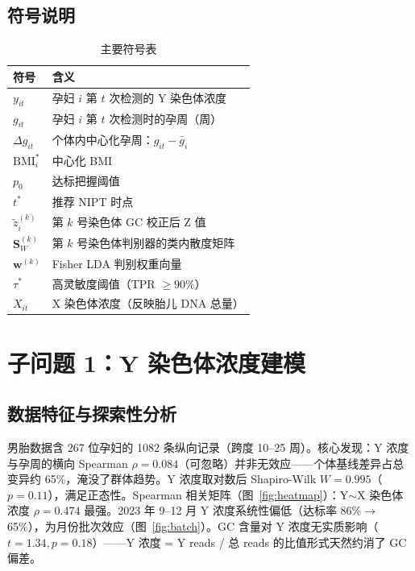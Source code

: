 \documentclass{mcm-paper}
\begin{document}
\subsection{符号说明}

\begin{table}[H]
\centering
\caption{主要符号表}
\begin{tabular}{ll}
\toprule
符号 & 含义 \\
\midrule
$y_{it}$ & 孕妇 $i$ 第 $t$ 次检测的 Y 染色体浓度 \\
$g_{it}$ & 孕妇 $i$ 第 $t$ 次检测时的孕周（周） \\
$\Delta g_{it}$ & 个体内中心化孕周：$g_{it}-\bar{g}_i$ \\
$\mathrm{BMI}_i^*$ & 中心化 BMI \\
$p_0$ & 达标把握阈值 \\
$t^*$ & 推荐 NIPT 时点 \\
$\tilde{z}_i^{(k)}$ & 第 $k$ 号染色体 GC 校正后 Z 值 \\
$\mathbf{S}_W^{(k)}$ & 第 $k$ 号染色体判别器的类内散度矩阵 \\
$\mathbf{w}^{(k)}$ & Fisher LDA 判别权重向量 \\
$\tau^*$ & 高灵敏度阈值（TPR $\geq 90\%$） \\
$X_{it}$ & X 染色体浓度（反映胎儿 DNA 总量） \\
\bottomrule
\end{tabular}
\end{table}

\newpage

\section{子问题 1：Y 染色体浓度建模}

\subsection{数据特征与探索性分析}

男胎数据含 267 位孕妇的 1082 条纵向记录（跨度 10--25 周）。核心发现：Y 浓度与孕周的横向 Spearman $\rho=0.084$（可忽略）并非无效应——个体基线差异占总变异约 65\%，淹没了群体趋势。Y 浓度取对数后 Shapiro-Wilk $W=0.995$（$p=0.11$），满足正态性。Spearman 相关矩阵（图~\ref{fig:heatmap}）：Y$\sim$X 染色体浓度 $\rho=0.474$ 最强。2023 年 9--12 月 Y 浓度系统性偏低（达标率 86\%$\to$65\%），为月份批次效应（图~\ref{fig:batch}）。GC 含量对 Y 浓度无实质影响（$t=1.34, p=0.18$）——Y 浓度 = Y reads / 总 reads 的比值形式天然约消了 GC 偏差。
\end{document}
